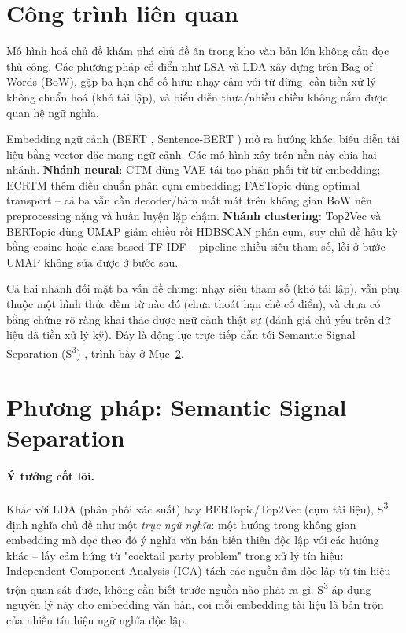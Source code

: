 \documentclass[11pt]{article}
\begin{document}
\section{Công trình liên quan}
\label{sec:related-work}

Mô hình hoá chủ đề khám phá chủ đề ẩn trong kho văn bản lớn không cần đọc
thủ công. Các phương pháp cổ điển như LSA \citep{deerwester1988lsa} và LDA
\citep{blei2003lda} xây dựng trên Bag-of-Words (BoW), gặp ba hạn chế cố
hữu: nhạy cảm với từ dừng, cần tiền xử lý không chuẩn hoá (khó tái lập),
và biểu diễn thưa/nhiều chiều không nắm được quan hệ ngữ nghĩa.

Embedding ngữ cảnh (BERT \citep{devlin2019bert}, Sentence-BERT
\citep{reimers2019sbert}) mở ra hướng khác: biểu diễn tài liệu bằng vector
đặc mang ngữ cảnh. Các mô hình xây trên nền này chia hai nhánh.
\textbf{Nhánh neural}: CTM \citep{bianchi2021ctm} dùng VAE tái tạo phân
phối từ từ embedding; ECRTM \citep{wu2023ecrtm} thêm điều chuẩn phân cụm
embedding; FASTopic \citep{wu2024fastopic} dùng optimal transport -- cả ba
vẫn cần decoder/hàm mất mát trên không gian BoW nên preprocessing nặng và
huấn luyện lặp chậm. \textbf{Nhánh clustering}: Top2Vec
\citep{angelov2020top2vec} và BERTopic \citep{grootendorst2022bertopic}
dùng UMAP \citep{mcinnes2018umap} giảm chiều rồi HDBSCAN
\citep{campello2013hdbscan} phân cụm, suy chủ đề hậu kỳ bằng cosine hoặc
class-based TF-IDF -- pipeline nhiều siêu tham số, lỗi ở bước UMAP không
sửa được ở bước sau.

Cả hai nhánh đối mặt ba vấn đề chung: nhạy siêu tham số (khó tái lập), vẫn
phụ thuộc một hình thức đếm từ nào đó (chưa thoát hạn chế cổ điển), và
chưa có bằng chứng rõ ràng khai thác được ngữ cảnh thật sự (đánh giá chủ
yếu trên dữ liệu đã tiền xử lý kỹ). Đây là động lực trực tiếp dẫn tới
Semantic Signal Separation (S\textsuperscript{3}) \citep{kardos2025s3},
trình bày ở Mục~\ref{sec:method}.

\section{Phương pháp: Semantic Signal Separation}
\label{sec:method}

\paragraph{Ý tưởng cốt lõi.} Khác với LDA (phân phối xác suất) hay
BERTopic/Top2Vec (cụm tài liệu), S\textsuperscript{3}
\citep{kardos2025s3} định nghĩa chủ đề như một \emph{trục ngữ nghĩa}: một
hướng trong không gian embedding mà dọc theo đó ý nghĩa văn bản biến
thiên độc lập với các hướng khác -- lấy cảm hứng từ "cocktail party
problem" trong xử lý tín hiệu: Independent Component Analysis (ICA)
\citep{jutten1991ica,hyvarinen2000fastica} tách các nguồn âm độc lập từ
tín hiệu trộn quan sát được, không cần biết trước nguồn nào phát ra gì.
S\textsuperscript{3} áp dụng nguyên lý này cho embedding văn bản, coi mỗi
embedding tài liệu là bản trộn của nhiều tín hiệu ngữ nghĩa độc lập.
\end{document}
